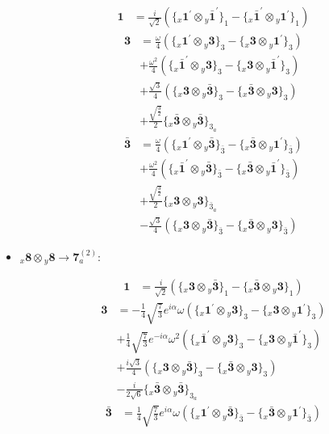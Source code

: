\documentclass[english]{article}
\newcommand{\rep}[1]{\mathbf{#1}}
\newcommand{\repx}[2]{{}_{#2}\mathbf{#1}}
\newcommand{\tsprodx}[2]{\repx{#1}{x}\otimes\repx{#2}{y}}
\newcommand{\subcgt}[3]{\big\{ \tsprodx{#1}{#2}\big\}^{}_{#3}}
\begin{document}
\begin{itemize}
\begin{fleqn}
\begin{align*}
\rep{1} & = \frac{i}{\sqrt{2}}\left(\subcgt{1^{\prime}}{\bar{1}^{\prime}}{1}-\subcgt{\bar{1}^{\prime}}{1^{\prime}}{1}\right)
\end{align*}
\begin{align*}
\rep{3} & = \frac{\omega }{4}\left(\subcgt{1^{\prime}}{3}{3}-\subcgt{3}{1^{\prime}}{3}\right) \\ 
 & +\frac{\omega ^2}{4}\left(\subcgt{\bar{1}^{\prime}}{3}{3}-\subcgt{3}{\bar{1}^{\prime}}{3}\right) \\ 
 & +\frac{\sqrt{3}}{4}\left(\subcgt{3}{\bar{3}}{3}-\subcgt{\bar{3}}{3}{3}\right) \\ 
 & +\frac{\sqrt{\frac{3}{2}}}{2}\subcgt{\bar{3}}{\bar{3}}{3_{a}}
\end{align*}
\begin{align*}
\rep{\bar{3}} & = \frac{\omega }{4}\left(\subcgt{1^{\prime}}{\bar{3}}{\bar{3}}-\subcgt{\bar{3}}{1^{\prime}}{\bar{3}}\right) \\ 
 & +\frac{\omega ^2}{4}\left(\subcgt{\bar{1}^{\prime}}{\bar{3}}{\bar{3}}-\subcgt{\bar{3}}{\bar{1}^{\prime}}{\bar{3}}\right) \\ 
 & +\frac{\sqrt{\frac{3}{2}}}{2}\subcgt{3}{3}{\bar{3}_{a}} \\ 
 & -\frac{\sqrt{3}}{4}\left(\subcgt{3}{\bar{3}}{\bar{3}}-\subcgt{\bar{3}}{3}{\bar{3}}\right)
\end{align*}
\end{fleqn}
\item $\tsprodx{8}{8}\to\rep{7}_{a}^{(2)}$:
\begin{fleqn}
\begin{align*}
\rep{1} & = \frac{i}{\sqrt{2}}\left(\subcgt{3}{\bar{3}}{1}-\subcgt{\bar{3}}{3}{1}\right)
\end{align*}
\begin{align*}
\rep{3} & = -\frac{1}{4} \sqrt{\frac{7}{3}} e^{i \alpha } \omega\left(\subcgt{1^{\prime}}{3}{3}-\subcgt{3}{1^{\prime}}{3}\right) \\ 
 & +\frac{1}{4} \sqrt{\frac{7}{3}} e^{-i \alpha } \omega ^2\left(\subcgt{\bar{1}^{\prime}}{3}{3}-\subcgt{3}{\bar{1}^{\prime}}{3}\right) \\ 
 & +\frac{i \sqrt{3}}{4}\left(\subcgt{3}{\bar{3}}{3}-\subcgt{\bar{3}}{3}{3}\right) \\ 
 & -\frac{i}{2 \sqrt{6}}\subcgt{\bar{3}}{\bar{3}}{3_{a}}
\end{align*}
\begin{align*}
\rep{\bar{3}} & = \frac{1}{4} \sqrt{\frac{7}{3}} e^{i \alpha } \omega\left(\subcgt{1^{\prime}}{\bar{3}}{\bar{3}}-\subcgt{\bar{3}}{1^{\prime}}{\bar{3}}\right) \\ 

\end{align*}
\end{fleqn}
\end{itemize}
\end{document}
